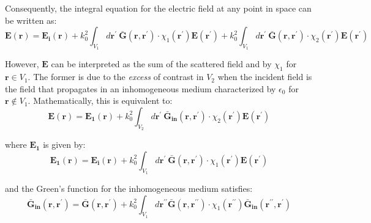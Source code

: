			Consequently, the integral equation for the electric field at any point in space can be written as:
			\begin{equation}
				\mathbf{E}(\mathbf{r}) = \mathbf{E_i}(\mathbf{r}) + k_0^2\int_{V_1}d\mathbf{r^\prime}~\mathbf{\bar{G}}(\mathbf{r},\mathbf{r^\prime})\cdot\chi_1(\mathbf{r^\prime})\mathbf{E}(\mathbf{r^\prime}) + k_0^2\int_{V_1}d\mathbf{r^\prime}~\mathbf{\bar{G}}(\mathbf{r},\mathbf{r^\prime})\cdot\chi_2(\mathbf{r^\prime})\mathbf{E}(\mathbf{r^\prime}) \label{eq:app:green:26}
			\end{equation}
   
   			However, $\mathbf{E}$ can be interpreted as the sum of the scattered field and by $\chi_1$ for $\mathbf{r}\in V_1$. The former is due to the \textit{excess} of contrast in $V_2$ when the incident field is the field that propagates in an inhomogeneous medium characterized by $\epsilon_0$ for $\mathbf{r}\notin V_1$. Mathematically, this is equivalent to:
   			\begin{equation}
   				\mathbf{E}(\mathbf{r}) = \mathbf{E_1}(\mathbf{r}) + k_0^2\int_{V_2} d\mathbf{r^\prime}~ \mathbf{\bar{G}_{in}}(\mathbf{r},\mathbf{r^\prime})\cdot\chi_2(\mathbf{r^\prime})\mathbf{E}(\mathbf{r^\prime}) \label{eq:app:green:27}
   			\end{equation}
   		
   			\noindent where $\mathbf{E_1}$ is given by:
   			\begin{equation}
   				\mathbf{E_1}(\mathbf{r}) = \mathbf{E_i}(\mathbf{r}) + k_0^2\int_{V_1} d\mathbf{r^\prime}~ \mathbf{\bar{G}}(\mathbf{r},\mathbf{r^\prime})\cdot\chi_1(\mathbf{r^\prime})\mathbf{E}(\mathbf{r^\prime}) \label{eq:app:green:28}
   			\end{equation}
   			
   			\noindent and the Green's function for the inhomogeneous medium satisfies:
   			\begin{equation}
   				\mathbf{\bar{G}_{in}}(\mathbf{r},\mathbf{r^\prime}) = \mathbf{\bar{G}}(\mathbf{r},\mathbf{r^\prime}) + k_0^2 \int_{V_1}d\mathbf{r^{\prime\prime}} \mathbf{\bar{G}}(\mathbf{r},\mathbf{r^{\prime\prime}})\cdot\chi_{1}(\mathbf{r^{\prime\prime}})\mathbf{\bar{G}_{in}}(\mathbf{r^{\prime\prime}},\mathbf{r^\prime}) \label{eq:app:green:29}
   			\end{equation}
   		
